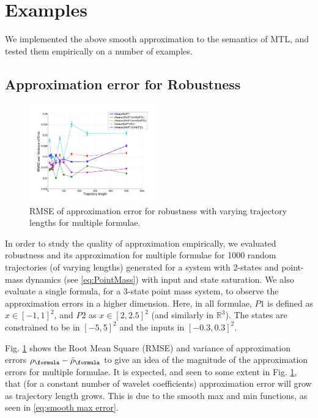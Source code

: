\section{Examples}
\label{sec:examples}
We implemented the above smooth approximation to the semantics of MTL, and tested them empirically on a number of examples.

\subsection{Approximation error for Robustness}
\label{sec: ex apx error}
\begin{figure}[t]
\centering
\includegraphics[width=0.49\textwidth]{figures/RobustnessError}
\caption{RMSE of approximation error for robustness with varying trajectory lengths for multiple formulae.}
\label{fig:sample result}
\end{figure}

In order to study the quality of approximation empirically, we evaluated robustness and its approximation for multiple formulae for 1000 random trajectories (of varying lengths) generated for a system with 2-states and point-mass dynamics (see \eqref{eq:PointMass}) with input and state saturation. We also evaluate a single formula, for a 3-state point mass system, to observe the approximation errors in a higher dimension. Here, in all formulae, $P1$ is defined as $x \in [-1,1]^2$, and $P2$ as $x\in [2,2.5]^2$ (and similarly in $\mathbb{R}^3$). The states are constrained to be in $[-5,5]^2$ and the inputs in $[-0.3,0.3]^2$. 

Fig. \ref{fig:sample result} shows the Root Mean Square (RMSE) and variance of approximation errors $\robf-\srobf$ to give an idea of the magnitude of the approximation errors for multiple formulae. 
It is expected, and seen to some extent in Fig. \ref{fig:sample result}, that (for a constant number of wavelet coefficients) approximation error will grow as trajectory length grows. This is due to the smooth max and min functions, as seen in \eqref{eq:smooth max error}.

